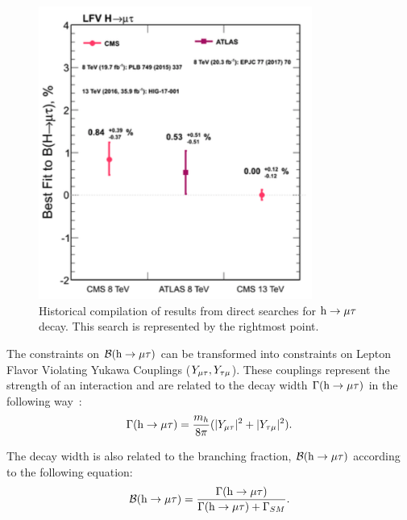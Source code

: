 \begin{figure}[!htpb]\centering
  \captionsetup{width=.8\linewidth}
 \includegraphics[width=0.8\textwidth]{plots_and_figures/chapter8/h125/hist_limit.png}
 \caption{Historical compilation of results from direct searches for $\text{h} \to \mu \tau$ decay. This search is represented by the rightmost point.}
 \label{fig:hist_limits}
\end{figure}


The constraints on $\mathcal{B}(\text{h} \to \mu \tau)$ can be transformed into constraints on Lepton Flavor Violating Yukawa Couplings ($Y_{\mu\tau},Y_{\tau\mu}$). These couplings represent the strength of an interaction and are related to the decay width $\Gamma(\text{h} \to \mu \tau)$ in the following way~\cite{Harnik:2012pb}:
\begin{equation}                                                                                                                                                                                                 
\Gamma(\text{h} \to \mu \tau)=\frac{m_{h}}{8\pi}(|Y_{\mu\tau}|^2 + |Y_{\tau\mu}|^2).                                                          
\label{eq:yuk1}
\end{equation}

The decay width is also related to the branching fraction, $\mathcal{B}(\text{h} \to \mu \tau)$ according to the following equation:
\begin{equation}                                                                                                                                                                                                \mathcal{B}(\text{h} \to \mu \tau)=\frac{\Gamma(\text{h} \to \mu \tau)}{\Gamma(\text{h} \to \mu \tau) + \Gamma_{SM}}.
\label{eq:yuk2}
\end{equation}

